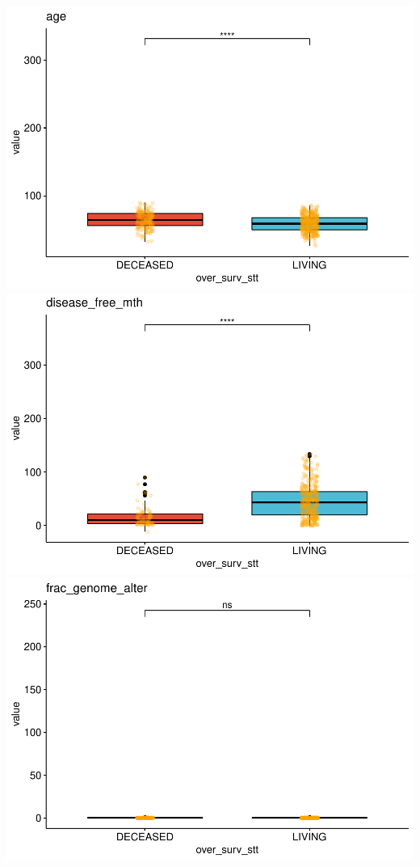 \documentclass[]{article}
\begin{document}
\includegraphics{figs/render-unnamed-chunk-11-1.pdf}
\includegraphics{figs/render-unnamed-chunk-11-2.pdf}
\includegraphics{figs/render-unnamed-chunk-11-3.pdf}
\end{document}
